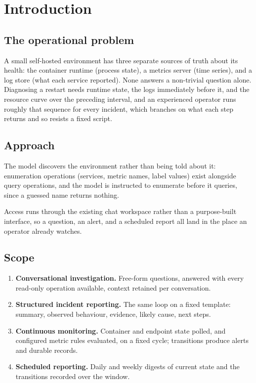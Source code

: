 \documentclass[11pt,a4paper]{article}
\let\stdsection\section
\renewcommand{\section}{\clearpage\stdsection}
\begin{document}
\clearpage
\setcounter{tocdepth}{1}
\tableofcontents

\clearpage
{}

\section{Introduction}

\subsection{The operational problem}

A small self-hosted environment has three separate sources of truth about its
health: the container runtime (process state), a metrics server (time series), and
a log store (what each service reported). None answers a non-trivial question
alone. Diagnosing a restart needs runtime state, the logs immediately before it,
and the resource curve over the preceding interval, and an experienced operator
runs roughly that sequence for every incident, which branches on what each step
returns and so resists a fixed script.

\subsection{Approach}

The model discovers the environment rather than being told about it: enumeration
operations (services, metric names, label values) exist alongside query operations,
and the model is instructed to enumerate before it queries, since a guessed name
returns nothing.

Access runs through the existing chat workspace rather than a purpose-built
interface, so a question, an alert, and a scheduled report all land in the place an
operator already watches.

\subsection{Scope}

\begin{enumerate}
  \item \textbf{Conversational investigation.} Free-form questions, answered with
        every read-only operation available, context retained per conversation.
  \item \textbf{Structured incident reporting.} The same loop on a fixed template:
        summary, observed behaviour, evidence, likely cause, next steps.
  \item \textbf{Continuous monitoring.} Container and endpoint state polled, and
        configured metric rules evaluated, on a fixed cycle; transitions produce
        alerts and durable records.
  \item \textbf{Scheduled reporting.} Daily and weekly digests of current state and
        the transitions recorded over the window.
\end{enumerate}
\end{document}
